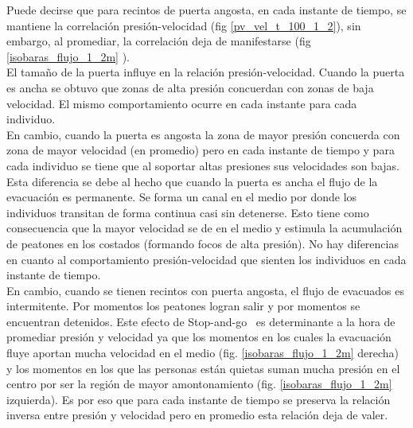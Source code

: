 Puede decirse que para recintos de puerta angosta, en cada instante de tiempo, se mantiene la correlación presión-velocidad (fig \ref{pv_vel_t_100_1_2}), sin embargo, al promediar, la correlación deja de manifestarse (fig \ref{isobaras_flujo_1_2m} ). \\
El tamaño de la puerta influye en la relación presión-velocidad. Cuando la puerta es ancha se obtuvo que zonas de alta presión concuerdan con zonas de baja velocidad. El mismo comportamiento ocurre en cada instante para cada individuo. \\

En cambio, cuando la puerta es angosta la zona de mayor presión concuerda con zona de mayor velocidad (en promedio) pero en cada instante de tiempo y para cada individuo se tiene que al soportar altas presiones sus velocidades son bajas. \\
Esta diferencia se debe al hecho que cuando la puerta es ancha el flujo de la evacuación es permanente. Se forma un canal en el medio por donde los individuos transitan de forma continua casi sin detenerse. Esto tiene como consecuencia que la mayor velocidad se de en el medio y estimula la acumulación de peatones en los costados (formando focos de alta presión). No hay diferencias en cuanto al comportamiento presión-velocidad que sienten los individuos en cada instante de tiempo.\\

En cambio, cuando se tienen recintos con puerta angosta, el flujo de evacuados es intermitente. Por momentos los peatones logran salir y por momentos se encuentran detenidos. Este efecto de Stop-and-go~\cite{stop-go} es determinante a la hora de promediar presión y velocidad ya que los momentos en los cuales la evacuación fluye aportan mucha velocidad en el medio (fig. \ref{isobaras_flujo_1_2m} derecha) y los momentos en los que las personas están quietas suman mucha presión en el centro por ser la región de mayor amontonamiento (fig. \ref{isobaras_flujo_1_2m} izquierda). Es por eso que para cada instante de tiempo se preserva la relación inversa entre presión y velocidad pero en promedio esta relación deja de valer.

